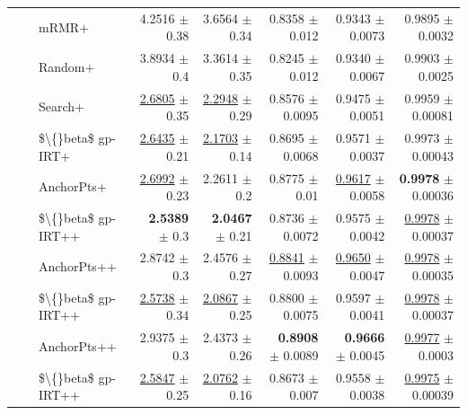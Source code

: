 \begin{longtable}{llp{}rrrrr}
 &  & mRMR+ & 4.2516 {\scriptsize $\pm$ 0.38} & 3.6564 {\scriptsize $\pm$ 0.34} & 0.8358 {\scriptsize $\pm$ 0.012} & 0.9343 {\scriptsize $\pm$ 0.0073} & 0.9895 {\scriptsize $\pm$ 0.0032} \\
 &  & Random+ & 3.8934 {\scriptsize $\pm$ 0.4} & 3.3614 {\scriptsize $\pm$ 0.35} & 0.8245 {\scriptsize $\pm$ 0.012} & 0.9340 {\scriptsize $\pm$ 0.0067} & 0.9903 {\scriptsize $\pm$ 0.0025} \\
 &  & Search+ & \underline{2.6805} {\scriptsize $\pm$ 0.35} & \underline{2.2948} {\scriptsize $\pm$ 0.29} & 0.8576 {\scriptsize $\pm$ 0.0095} & 0.9475 {\scriptsize $\pm$ 0.0051} & 0.9959 {\scriptsize $\pm$ 0.00081} \\
 &  & \$\textbackslash\{\}beta\$ gp-IRT+ & \underline{2.6435} {\scriptsize $\pm$ 0.21} & \underline{2.1703} {\scriptsize $\pm$ 0.14} & 0.8695 {\scriptsize $\pm$ 0.0068} & 0.9571 {\scriptsize $\pm$ 0.0037} & 0.9973 {\scriptsize $\pm$ 0.00043} \\
 &  & AnchorPts+ & \underline{2.6992} {\scriptsize $\pm$ 0.23} & 2.2611 {\scriptsize $\pm$ 0.2} & 0.8775 {\scriptsize $\pm$ 0.01} & \underline{0.9617} {\scriptsize $\pm$ 0.0058} & \textbf{0.9978} {\scriptsize $\pm$ 0.00036} \\
 &  & \$\textbackslash\{\}beta\$ gp-IRT++ & \textbf{2.5389} {\scriptsize $\pm$ 0.3} & \textbf{2.0467} {\scriptsize $\pm$ 0.21} & 0.8736 {\scriptsize $\pm$ 0.0072} & 0.9575 {\scriptsize $\pm$ 0.0042} & \underline{0.9978} {\scriptsize $\pm$ 0.00037} \\
 &  & AnchorPts++ & 2.8742 {\scriptsize $\pm$ 0.3} & 2.4576 {\scriptsize $\pm$ 0.27} & \underline{0.8841} {\scriptsize $\pm$ 0.0093} & \underline{0.9650} {\scriptsize $\pm$ 0.0047} & \underline{0.9978} {\scriptsize $\pm$ 0.00035} \\
 &  & \$\textbackslash\{\}beta\$ gp-IRT++ & \underline{2.5738} {\scriptsize $\pm$ 0.34} & \underline{2.0867} {\scriptsize $\pm$ 0.25} & 0.8800 {\scriptsize $\pm$ 0.0075} & 0.9597 {\scriptsize $\pm$ 0.0041} & \underline{0.9978} {\scriptsize $\pm$ 0.00037} \\
 &  & AnchorPts++ & 2.9375 {\scriptsize $\pm$ 0.3} & 2.4373 {\scriptsize $\pm$ 0.26} & \textbf{0.8908} {\scriptsize $\pm$ 0.0089} & \textbf{0.9666} {\scriptsize $\pm$ 0.0045} & \underline{0.9977} {\scriptsize $\pm$ 0.0003} \\
 &  & \$\textbackslash\{\}beta\$ gp-IRT++ & \underline{2.5847} {\scriptsize $\pm$ 0.25} & \underline{2.0762} {\scriptsize $\pm$ 0.16} & 0.8673 {\scriptsize $\pm$ 0.007} & 0.9558 {\scriptsize $\pm$ 0.0038} & \underline{0.9975} {\scriptsize $\pm$ 0.00039} \\

\end{longtable}
